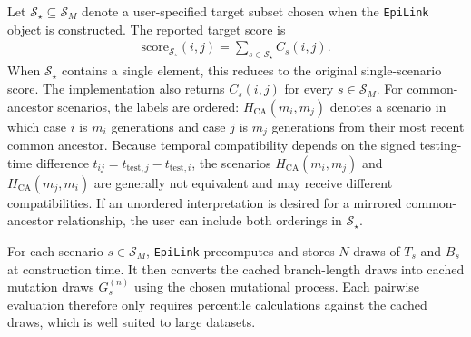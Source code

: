 \documentclass[10pt,a4paper]{article}
\begin{document}
Let $\mathcal{S}_\star \subseteq \mathcal{S}_M$ denote a user-specified target subset chosen when the \texttt{EpiLink} object is constructed. The reported target score is
\begin{align}
\mathrm{score}_{\mathcal{S}_\star}(i,j) = \sum_{s \in \mathcal{S}_\star} C_s(i,j).
\end{align}
When $\mathcal{S}_\star$ contains a single element, this reduces to the original single-scenario score. The implementation also returns $C_s(i,j)$ for every $s \in \mathcal{S}_M$.
For common-ancestor scenarios, the labels are ordered: $H_{\mathrm{CA}}(m_i,m_j)$ denotes a scenario in which case $i$ is $m_i$ generations and case $j$ is $m_j$ generations from their most recent common ancestor. Because temporal compatibility depends on the signed testing-time difference $t_{ij} = t_{\mathrm{test},j} - t_{\mathrm{test},i}$, the scenarios $H_{\mathrm{CA}}(m_i,m_j)$ and $H_{\mathrm{CA}}(m_j,m_i)$ are generally not equivalent and may receive different compatibilities. If an unordered interpretation is desired for a mirrored common-ancestor relationship, the user can include both orderings in $\mathcal{S}_\star$.

For each scenario $s \in \mathcal{S}_M$, \texttt{EpiLink} precomputes and stores $N$ draws of $T_s$ and $B_s$ at construction time. It then converts the cached branch-length draws into cached mutation draws $G_s^{(n)}$ using the chosen mutational process. Each pairwise evaluation therefore only requires percentile calculations against the cached draws, which is well suited to large datasets.



\end{document}
